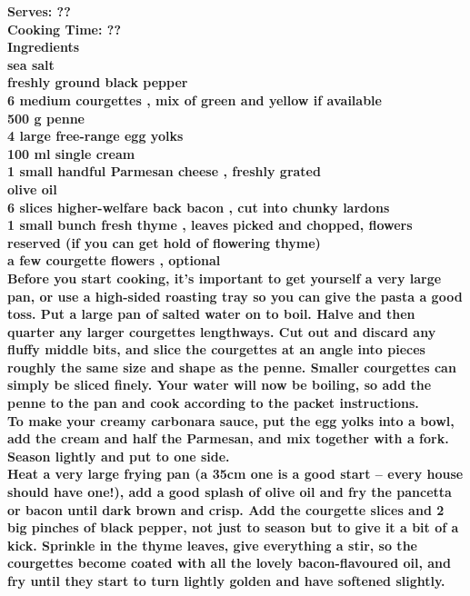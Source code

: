 \documentclass[18pt, oneside]{book}
\begin{document}
\bf{Serves: ??} \\
\bf{Cooking Time: ??} \\

\bf{Ingredients} \normalfont \\
sea salt \\
freshly ground black pepper \\
6 medium courgettes , mix of green and yellow if available \\
500 g penne \\
4 large free-range egg yolks \\
100 ml single cream \\
1 small handful Parmesan cheese , freshly grated \\
olive oil \\
6 slices higher-welfare back bacon , cut into chunky lardons \\
1 small bunch fresh thyme , leaves picked and chopped, flowers reserved (if you can get hold of flowering thyme) \\
a few courgette flowers , optional \\

Before you start cooking, it’s important to get yourself a very large pan, or use a high-sided roasting tray so you can give the pasta a good toss. Put a large pan of salted water on to boil. Halve and then quarter any larger courgettes lengthways. Cut out and discard any fluffy middle bits, and slice the courgettes at an angle into pieces roughly the same size and shape as the penne. Smaller courgettes can simply be sliced finely. Your water will now be boiling, so add the penne to the pan and cook according to the packet instructions. \\

To make your creamy carbonara sauce, put the egg yolks into a bowl, add the cream and half the Parmesan, and mix together with a fork. Season lightly and put to one side. \\

Heat a very large frying pan (a 35cm one is a good start – every house should have one!), add a good splash of olive oil and fry the pancetta or bacon until dark brown and crisp. Add the courgette slices and 2 big pinches of black pepper, not just to season but to give it a bit of a kick. Sprinkle in the thyme leaves, give everything a stir, so the courgettes become coated with all the lovely bacon-flavoured oil, and fry until they start to turn lightly golden and have softened slightly. \\
\end{document}
